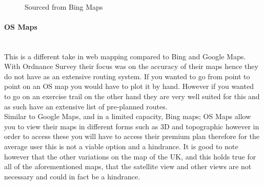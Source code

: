 \begin{FlushLeft}
            \bk
 
            \begin{figure}[H]
                \centering
                \caption*{Sourced from Bing Maps\textsuperscript{\tiny\textcopyright}}
            \end{figure}

            \bk

            \paragraph{OS Maps} \mbox{} \\
            This is a different take in web mapping compared to Bing and Google Maps. With Ordnance Survey their focus was on the accuracy of their maps hence they do not have as an extensive routing system.
            If you wanted to go from point to point on an OS map you would have to plot it by hand. However if you wanted to go on an exercise trail on the other hand they are very well suited
            for this and as such have an extensive list of pre-planned routes. \\
            \bk
            Similar to Google Maps, and in a limited capacity, Bing maps; OS Maps allow you to view their maps in different forms such as 3D and topographic however in order to access these you will
            have to access their premium plan therefore for the average user this is not a viable option and a hindrance. It is good to note however that the other variations on the map of the UK,
            and this holds true for all of the aforementioned maps, that the satellite view and other views are not necessary and could in fact be a hindrance. \\
            
            \bk
            

\end{FlushLeft}
